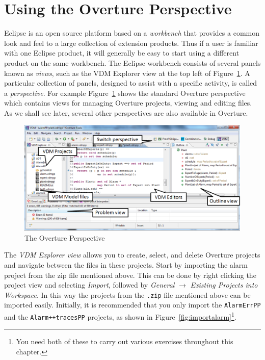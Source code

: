 \section{Using the Overture Perspective}\label{sec:vdmsupport}
Eclipse is an open source platform based on a \emph{workbench} that provides a common look and feel to a large collection of extension products. Thus if a user is familiar with one Eclipse product, it will generally be easy to start using a different product on the same workbench. The Eclipse workbench consists of several panels known as \emph{views}, such as the VDM Explorer view at the top left of Figure~\ref{fig:OverturePerspective}. A particular collection of panels, designed to assist with a specific activity, is called a \emph{perspective}. For example Figure~\ref{fig:OverturePerspective} shows the standard Overture perspective which contains views for managing Overture projects, viewing and editing files. As we shall see later, several other perspectives are also available in Overture.
%
\begin{figure}[!htb]
\begin{center}
  \includegraphics[width=5in]{figures/OverturePerspective}
  \caption[labelInTOC]{The Overture Perspective}
  \label{fig:OverturePerspective}
\end{center}
\end{figure}
%
The \emph{VDM Explorer view} allows you to create, select, and delete Overture projects and navigate between the files in these projects. Start by importing the alarm project from the zip file mentioned above. This can be done by right clicking the project view and selecting \emph{Import}, followed by \emph{General} $\rightarrow$ \emph{Existing Projects into Workspace}.  In this way the projects from the \texttt{.zip} file mentioned above can be imported easily. Initially, it is recommended that you only import the \texttt{AlarmErrPP} and the \texttt{Alarm++tracesPP} projects, as shown in Figure~\ref{fig:importalarm}\footnote{You need both of these to carry out various exercises throughout this chapter.}.
